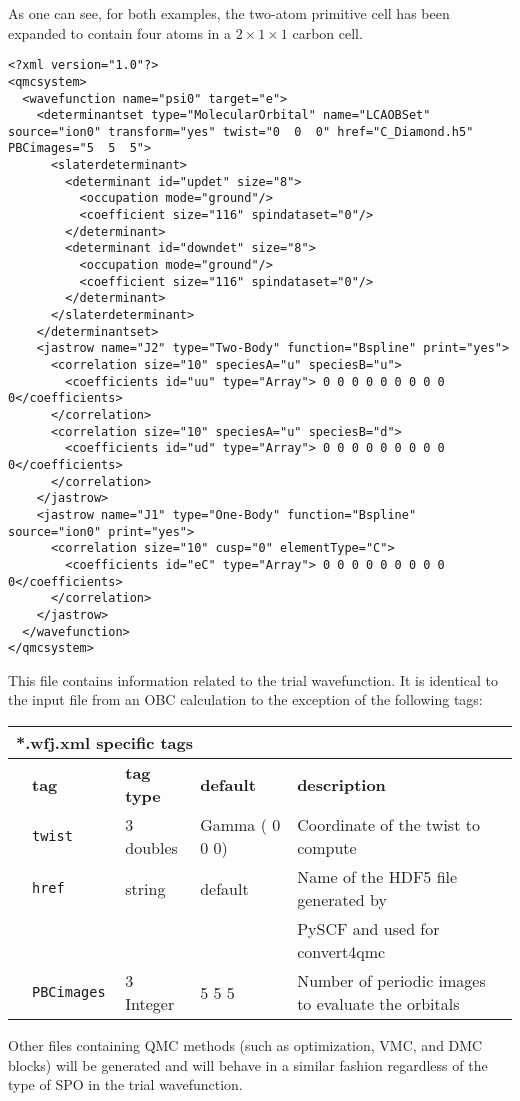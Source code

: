   As one can see, for both examples, the two-atom primitive cell has been expanded to contain four atoms in a $2 \times 1 \times 1$ carbon cell.
\begin{lstlisting}[style=QMCPXML,caption=CDiamond.wfj-Twist0.xml. This file contains the trial wavefunction.]
<?xml version="1.0"?>
<qmcsystem>
  <wavefunction name="psi0" target="e">
    <determinantset type="MolecularOrbital" name="LCAOBSet" source="ion0" transform="yes" twist="0  0  0" href="C_Diamond.h5" PBCimages="5  5  5">
      <slaterdeterminant>
        <determinant id="updet" size="8">
          <occupation mode="ground"/>
          <coefficient size="116" spindataset="0"/>
        </determinant>
        <determinant id="downdet" size="8">
          <occupation mode="ground"/>
          <coefficient size="116" spindataset="0"/>
        </determinant>
      </slaterdeterminant>
    </determinantset>
    <jastrow name="J2" type="Two-Body" function="Bspline" print="yes">
      <correlation size="10" speciesA="u" speciesB="u">
        <coefficients id="uu" type="Array"> 0 0 0 0 0 0 0 0 0 0</coefficients>
      </correlation>
      <correlation size="10" speciesA="u" speciesB="d">
        <coefficients id="ud" type="Array"> 0 0 0 0 0 0 0 0 0 0</coefficients>
      </correlation>
    </jastrow>
    <jastrow name="J1" type="One-Body" function="Bspline" source="ion0" print="yes">
      <correlation size="10" cusp="0" elementType="C">
        <coefficients id="eC" type="Array"> 0 0 0 0 0 0 0 0 0 0</coefficients>
      </correlation>
    </jastrow>
  </wavefunction>
</qmcsystem>
 \end{lstlisting}
This file contains information related to the trial wavefunction. It is identical to the input file from an OBC calculation to the exception of the following tags:\\
\begin{table}[h]
\begin{center}
\begin{tabularx}{\textwidth}{l l l l l }
\hline
\multicolumn{5}{l}{*.wfj.xml specific tags} \\
\hline
   &   \bfseries tag     & \bfseries tag type & \bfseries default   & \bfseries description \\
   &   \texttt{twist             } &  3 doubles  & Gamma ( 0 0 0)& Coordinate of the twist to compute\\
   &   \texttt{href             } &  string  & default& Name of the HDF5 file generated by\\ 
   &                              &          &        &  PySCF and used for convert4qmc\\  
   &   \texttt{PBCimages            } &  3 Integer   & 5 5 5  & Number of periodic images to evaluate the orbitals\\
    \hline
    \end{tabularx}
\end{center}
\end{table}

Other files containing QMC methods (such as optimization, VMC, and DMC blocks) will be generated and will behave in a similar fashion regardless of the type of SPO in the trial wavefunction. 




 

